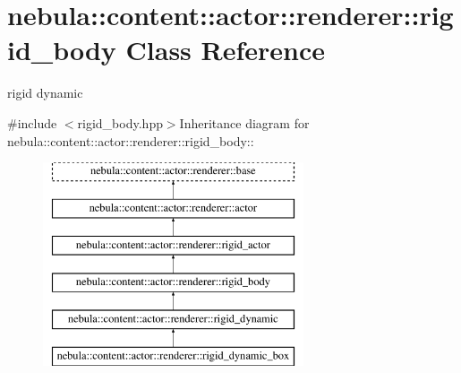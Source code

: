 \hypertarget{classnebula_1_1content_1_1actor_1_1renderer_1_1rigid__body}{
\section{nebula::content::actor::renderer::rigid\_\-body Class Reference}
\label{classnebula_1_1content_1_1actor_1_1renderer_1_1rigid__body}
}


rigid dynamic  


{\ttfamily \#include $<$rigid\_\-body.hpp$>$}Inheritance diagram for nebula::content::actor::renderer::rigid\_\-body::\begin{figure}[H]
\begin{center}
\leavevmode
\includegraphics[height=6cm]{classnebula_1_1content_1_1actor_1_1renderer_1_1rigid__body}
\end{center}
\end{figure}

